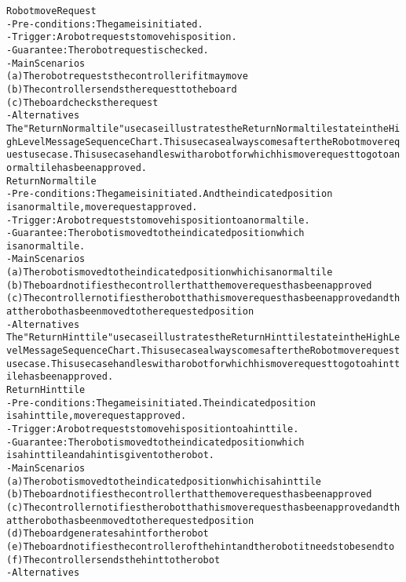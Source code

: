 \begin{alltt}
Robot move Request
- Pre-conditions: The game is initiated.
- Trigger: A robot requests to move his position.
- Guarantee: The robot request is checked.
- Main Scenarios
    (a) The robot requests the controller if it may move
    (b) The controller sends the request to the board
    (c) The board checks the request
- Alternatives \\

The "Return Normal tile" use case illustrates the Return Normal tile state in the High Level Message Sequence Chart. This use case always comes after the Robot move request use case. This use case handles with a robot for which his move request to go to a normal tile has been approved. \\

Return Normal tile
- Pre-conditions: The game is initiated. And the indicated position
    is a normal tile, move request approved.
- Trigger: A robot requests to move his position to a normal tile.
- Guarantee: The robot is moved to the indicated position which
    is a normal tile.
- Main Scenarios
    (a) The robot is moved to the indicated position which is a normal tile
    (b) The board notifies the controller that the move request has been approved
    (c) The controller notifies the robot that his move request has been approved and that the robot has been moved to the requested position
- Alternatives \\

The "Return Hint tile" use case illustrates the Return Hint tile state in the High Level Message Sequence Chart. This use case always comes after the Robot move request use case. This use case handles with a robot for which his move request to go to a hint tile has been approved. \\

Return Hint tile
- Pre-conditions: The game is initiated. The indicated position
    is a hint tile, move request approved.
- Trigger: A robot requests to move his position to a hint tile.
- Guarantee: The robot is moved to the indicated position which
    is a hint tile and a hint is given to the robot.
- Main Scenarios
    (a) The robot is moved to the indicated position which is a hint tile
    (b) The board notifies the controller that the move request has been approved
    (c) The controller notifies the robot that his move request has been approved and that the robot has been moved to the requested position
    (d) The board generates a hint for the robot
    (e) The board notifies the controller of the hint and the robot it needs to be send to
    (f) The controller sends the hint to the robot
- Alternatives \\


\end{alltt}
